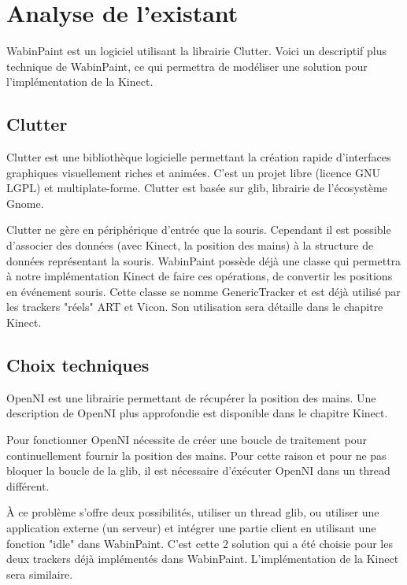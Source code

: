 \chapter{Analyse de l'existant}

WabinPaint est un logiciel utilisant la librairie Clutter. Voici un descriptif plus technique de WabinPaint, ce qui permettra de modéliser une solution pour l'implémentation de la Kinect.

\section{Clutter}

	Clutter est une bibliothèque logicielle permettant la création rapide d'interfaces graphiques visuellement riches et animées. C'est un projet libre (licence GNU LGPL) et multiplate-forme. Clutter est basée sur glib, librairie de l'écosystème Gnome.
	
	Clutter ne gère en périphérique d'entrée que la souris. Cependant il est possible d'associer des données (avec Kinect, la position des mains) à la structure de données représentant la souris. WabinPaint possède déjà une classe qui permettra à notre implémentation Kinect de faire ces opérations, de convertir les positions en événement souris. Cette classe se nomme GenericTracker et est déjà utilisé par les trackers "réels" ART et Vicon. Son utilisation sera détaille dans le chapitre Kinect.
	
\section{Choix techniques}

	OpenNI est une librairie permettant de récupérer la position des mains. Une description de OpenNI plus approfondie est disponible dans le chapitre Kinect.
	
	Pour fonctionner OpenNI nécessite de créer une boucle de traitement pour continuellement fournir la position des mains. Pour cette raison et pour ne pas bloquer la boucle de la glib, il est nécessaire d'éxécuter OpenNI dans un thread différent.
	
	À ce problème s'offre deux possibilités, utiliser un thread glib, ou utiliser une application externe (un serveur) et intégrer une partie client en utilisant
     une fonction "idle" dans WabinPaint. C'est cette 2 solution qui
     a été choisie pour les deux trackers déjà implémentés dans WabinPaint. L'implémentation de la Kinect sera similaire.
     
